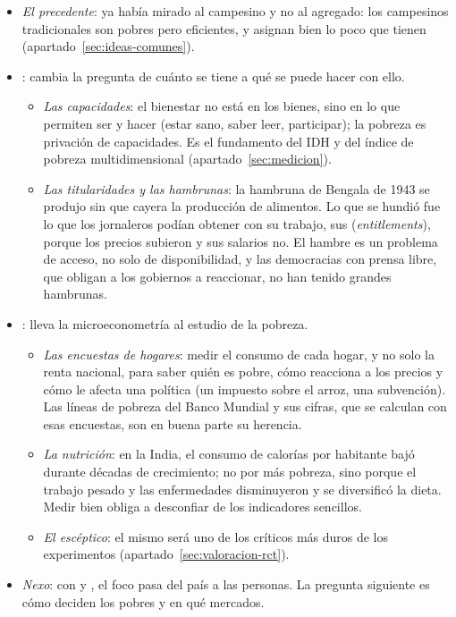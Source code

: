 \documentclass[11pt]{article}
\begin{document}
\begin{itemize}
\item \emph{El precedente}: \textcite{Schultz1964} ya había mirado al campesino y no al agregado: los campesinos tradicionales son pobres pero eficientes, y asignan bien lo poco que tienen (apartado~\ref{sec:ideas-comunes}).
\item \emph{}: cambia la pregunta de cuánto se tiene a qué se puede hacer con ello.
  \begin{itemize}
  \item \emph{Las capacidades}: el bienestar no está en los bienes, sino en lo que permiten ser y hacer (estar sano, saber leer, participar); la pobreza es privación de capacidades\nocite{Sen1985Commodities,Sen1999}. Es el fundamento del IDH y del índice de pobreza multidimensional (apartado~\ref{sec:medicion}).
  \item \emph{Las titularidades y las hambrunas}: la hambruna de Bengala de 1943 se produjo sin que cayera la producción de alimentos. Lo que se hundió fue lo que los jornaleros podían obtener con su trabajo, sus  (\emph{entitlements}), porque los precios subieron y sus salarios no\nocite{Sen1981Poverty}. El hambre es un problema de acceso, no solo de disponibilidad, y las democracias con prensa libre, que obligan a los gobiernos a reaccionar, no han tenido grandes hambrunas\nocite{Sen1999}.
  \end{itemize}
\item \emph{}: lleva la microeconometría al estudio de la pobreza.
  \begin{itemize}
  \item \emph{Las encuestas de hogares}: medir el consumo de cada hogar, y no solo la renta nacional, para saber quién es pobre, cómo reacciona a los precios y cómo le afecta una política (un impuesto sobre el arroz, una subvención)\nocite{Deaton1997Analysis}. Las líneas de pobreza del Banco Mundial y sus cifras, que se calculan con esas encuestas, son en buena parte su herencia.
  \item \emph{La nutrición}: en la India, el consumo de calorías por habitante bajó durante décadas de crecimiento; no por más pobreza, sino porque el trabajo pesado y las enfermedades disminuyeron y se diversificó la dieta\nocite{DeatonDreze2009}. Medir bien obliga a desconfiar de los indicadores sencillos.
  \item \emph{El escéptico}: el mismo  será uno de los críticos más duros de los experimentos (apartado~\ref{sec:valoracion-rct}).
  \end{itemize}
\item \emph{Nexo}: con  y , el foco pasa del país a las personas. La pregunta siguiente es cómo deciden los pobres y en qué mercados.
\end{itemize}
\end{document}
